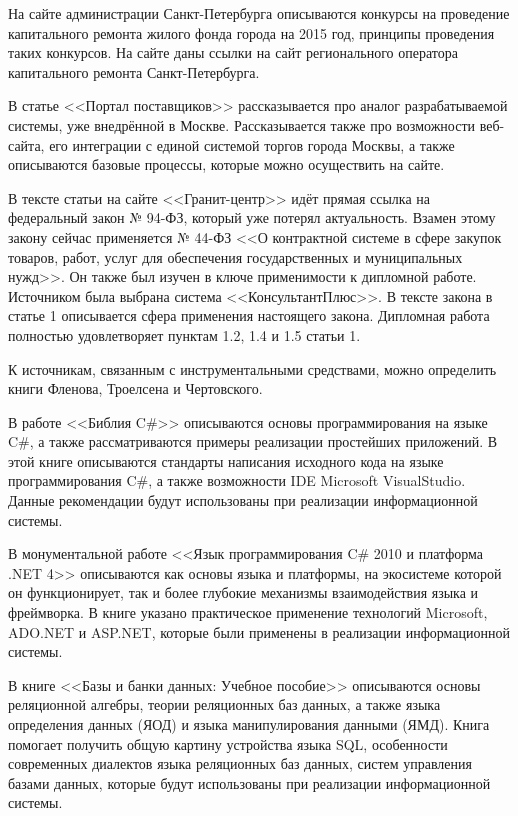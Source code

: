 На сайте администрации Санкт-Петербурга описываются конкурсы на проведение капитального ремонта жилого фонда города на 2015 год, принципы проведения таких конкурсов.
На сайте даны ссылки на сайт регионального оператора капитального ремонта Санкт-Петербурга.

В статье <<Портал поставщиков>> рассказывается про аналог разрабатываемой системы, уже внедрённой в Москве.
Рассказывается также про возможности веб-сайта, его интеграции с единой системой торгов города Москвы, а также описываются базовые процессы, которые можно осуществить на сайте.

В тексте статьи на сайте <<Гранит-центр>> идёт прямая ссылка на федеральный закон № 94-ФЗ, который уже потерял актуальность.
Взамен этому закону сейчас применяется № 44-ФЗ <<О контрактной системе в сфере закупок товаров, работ, услуг для обеспечения государственных и муниципальных нужд>>.
Он также был изучен в ключе применимости к дипломной работе.
Источником была выбрана система <<КонсультантПлюс>>.
В тексте закона в статье 1 описывается сфера применения настоящего закона. Дипломная работа полностью удовлетворяет пунктам 1.2, 1.4 и 1.5 статьи 1.

К источникам, связанным с инструментальными средствами, можно определить книги Фленова, Троелсена и Чертовского.

В работе <<Библия C\#>> описываются основы программирования на языке C\#, а также рассматриваются примеры реализации простейших приложений.
В этой книге описываются стандарты написания исходного кода на языке программирования C\#, а также возможности IDE Microsoft VisualStudio.
Данные рекомендации будут использованы при реализации информационной системы.

В монументальной работе <<Язык программирования C\# 2010 и платформа .NET 4>> описываются как основы языка и платформы, на экосистеме которой он функционирует, так и более глубокие механизмы взаимодействия языка и фреймворка.
В книге указано практическое применение технологий Microsoft, ADO.NET и ASP.NET, которые были применены в реализации информационной системы.

В книге <<Базы и банки данных: Учебное пособие>> описываются основы реляционной алгебры, теории реляционных баз данных, а также языка определения данных (ЯОД) и языка манипулирования данными (ЯМД).
Книга помогает получить общую картину устройства языка SQL, особенности современных диалектов языка реляционных баз данных, систем управления базами данных, которые будут использованы при реализации информационной системы.

